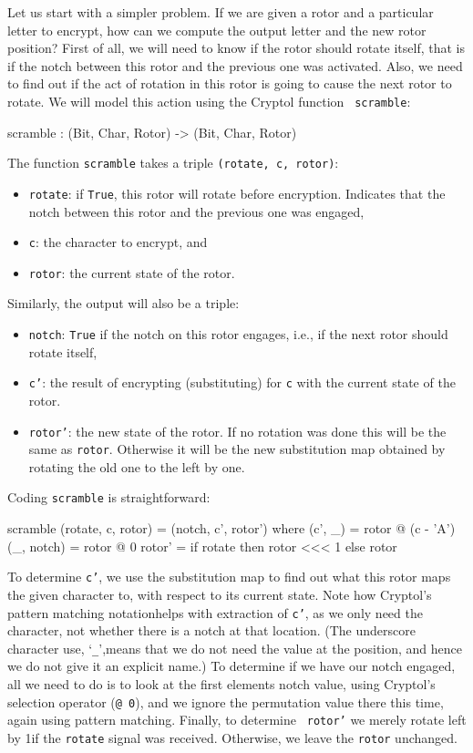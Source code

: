 Let us start with a simpler problem.  If we are given a rotor and a
particular letter to encrypt, how can we compute the output letter and
the new rotor position?  First of all, we will need to know if the
rotor should rotate itself, that is if the notch between this rotor
and the previous one was activated. Also, we need to find out if the
act of rotation in this rotor is going to cause the next rotor to
rotate. We will model this action using the Cryptol function {\tt
  scramble}:
\begin{code}
  scramble : (Bit, Char, Rotor) -> (Bit, Char, Rotor)
\end{code}
The function {\tt scramble} takes a triple \texttt{(rotate, c, rotor)}:
\begin{itemize}
\item {\tt rotate}: if {\tt True}, this rotor will rotate before
  encryption. Indicates that the notch between this rotor and the
  previous one was engaged,
  \item {\tt c}: the character to encrypt, and
  \item {\tt rotor}: the current state of the rotor.
\end{itemize}
Similarly, the output will also be a triple:
\begin{itemize}
\item {\tt notch}: {\tt True} if the notch on this rotor engages,
  i.e., if the next rotor should rotate itself,
\item {\tt c'}: the result of encrypting (substituting) for {\tt c}
  with the current state of the rotor.
\item {\tt rotor'}: the new state of the rotor. If no rotation was
  done this will be the same as {\tt rotor}. Otherwise it will be the
  new substitution map obtained by rotating the old one to the left by
  one.
\end{itemize}
Coding {\tt scramble} is straightforward:
\begin{code}
  scramble (rotate, c, rotor) = (notch, c', rotor')
    where 
      (c', _)    = rotor @ (c - 'A')
      (_, notch) = rotor @ 0
      rotor'     = if rotate then rotor <<< 1 else rotor
\end{code}
To determine {\tt c'}, we use the substitution map to find out what
this rotor maps the given character to, with respect to its current
state. Note how Cryptol's pattern matching notation\indPatMatch helps
with extraction of {\tt c'}, as we only need the character, not
whether there is a notch at that location.  (The underscore character
use, `\texttt{\_}',\indUnderscore means that we do not need the value
at the position, and hence we do not give it an explicit name.) To
determine if we have our notch engaged, all we need to do is to look
at the first elements notch value, using Cryptol's selection operator
({\tt @ 0}\indIndex), and we ignore the permutation value there this
time, again using pattern matching.  Finally, to determine {\tt
  rotor'} we merely rotate left by 1\indRotLeft if the {\tt rotate}
signal was received. Otherwise, we leave the {\tt rotor} unchanged.

